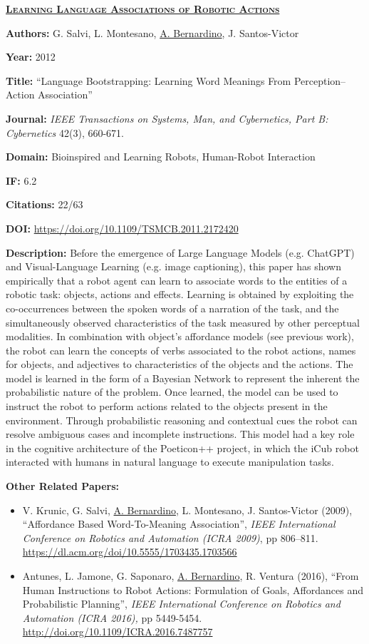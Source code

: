 \documentclass[
]{article}
\begin{document}
\textbf{\textsc{\ul{Learning Language Associations of Robotic Actions}}}

\textbf{Authors:} G. Salvi, L. Montesano, \ul{A. Bernardino}, J.
Santos-Victor

\textbf{Year:} 2012

\textbf{Title:} ``Language Bootstrapping: Learning Word Meanings From
Perception--Action Association''

\textbf{Journal:} \emph{IEEE Transactions on Systems, Man, and
Cybernetics, Part B: Cybernetics} 42(3), 660-671.

\textbf{Domain:} Bioinspired and Learning Robots, Human-Robot
Interaction

\textbf{IF:} 6.2

\textbf{Citations:} 22/63

\textbf{DOI:} \url{https://doi.org/10.1109/TSMCB.2011.2172420}

\textbf{Description:} Before the emergence of Large Language Models
(e.g. ChatGPT) and Visual-Language Learning (e.g. image captioning),
this paper has shown empirically that a robot agent can learn to
associate words to the entities of a robotic task: objects, actions and
effects. Learning is obtained by exploiting the co-occurrences between
the spoken words of a narration of the task, and the simultaneously
observed characteristics of the task measured by other perceptual
modalities. In combination with object's affordance models (see previous
work), the robot can learn the concepts of verbs associated to the robot
actions, names for objects, and adjectives to characteristics of the
objects and the actions. The model is learned in the form of a Bayesian
Network to represent the inherent the probabilistic nature of the
problem. Once learned, the model can be used to instruct the robot to
perform actions related to the objects present in the environment.
Through probabilistic reasoning and contextual cues the robot can
resolve ambiguous cases and incomplete instructions. This model had a
key role in the cognitive architecture of the Poeticon++ project, in
which the iCub robot interacted with humans in natural language to
execute manipulation tasks.

\textbf{Other Related Papers:}

\begin{itemize}
\item
  V. Krunic, G. Salvi, \ul{A. Bernardino}, L. Montesano, J.
  Santos-Victor (2009), ``Affordance Based Word-To-Meaning
  Association'', \emph{IEEE International Conference on Robotics and
  Automation (ICRA 2009)}, pp 806--811.
  \url{https://dl.acm.org/doi/10.5555/1703435.1703566}
\item
  Antunes, L. Jamone, G. Saponaro, \ul{A. Bernardino}, R. Ventura
  (2016), ``From Human Instructions to Robot Actions: Formulation of
  Goals, Affordances and Probabilistic Planning'', \emph{IEEE
  International Conference on Robotics and Automation (ICRA 2016),} pp
  5449-5454. \url{http://doi.org/10.1109/ICRA.2016.7487757}
\end{itemize}
\end{document}
